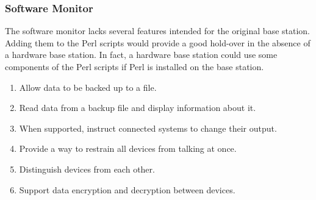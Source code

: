 \subsubsection{Software Monitor}
The software monitor lacks several features intended for the original
base station. Adding them to the Perl scripts would provide a good
hold-over in the absence of a hardware base station. In fact, a
hardware base station could use some components of the Perl scripts if Perl
is installed on the base station.
\begin{enumerate}
  \item Allow data to be backed up to a file.
  \item Read data from a backup file and display information about it.
  \item When supported, instruct connected systems to change their
    output.
  \item Provide a way to restrain all devices from talking at once.
  \item Distinguish devices from each other.
  \item Support data encryption and decryption between devices.
\end{enumerate}